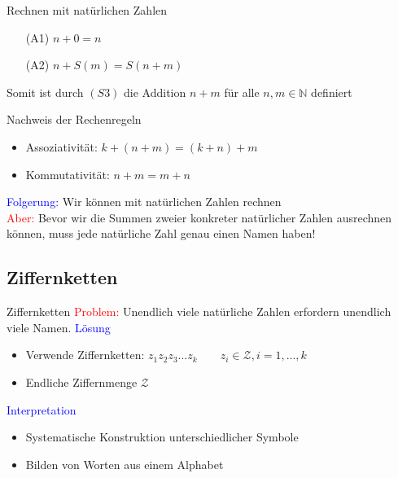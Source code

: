 \documentclass[12pt%
,aspectratio=169%
]{beamer}
\begin{document}
\begin{frame}{Rechnen mit natürlichen Zahlen}
\begin{definition}[Addition]
\begin{itemize}
	\item[(A1)] $n + 0 = n$
	\item[(A2)] $n + S(m) = S(n + m)$
\end{itemize}
\end{definition}
Somit ist durch $(S3)$ die Addition $n + m$ für alle $n, m \in \mathbb{N}$ definiert
\begin{block}{Nachweis der Rechenregeln}
\begin{itemize}
	\item Assoziativität: $k + (n + m) = (k + n) + m$
	\item Kommutativität: $n + m = m + n$
\end{itemize}
\end{block}
\textcolor{blue}{Folgerung:} Wir können mit natürlichen Zahlen rechnen\\
\textcolor{red}{Aber:} Bevor wir die Summen zweier konkreter natürlicher Zahlen ausrechnen können, muss jede natürliche Zahl genau einen Namen haben!
\end{frame}

\subsection{Ziffernketten}

\begin{frame}{Ziffernketten}
\textcolor{red}{Problem:} Unendlich viele natürliche Zahlen erfordern unendlich viele Namen.
\textcolor{blue}{Lösung}
\begin{itemize}
	\item Verwende Ziffernketten: $z_1z_2z_3 \ldots z_k \qquad z_i \in \mathcal{Z}, i = 1, \ldots , k$
	\item Endliche Ziffernmenge $\mathcal{Z}$
\end{itemize}

\textcolor{blue}{Interpretation}
\begin{itemize}
	\item Systematische Konstruktion unterschiedlicher Symbole
	\item Bilden von Worten aus einem Alphabet
\end{itemize}
\end{frame}
\end{document}
